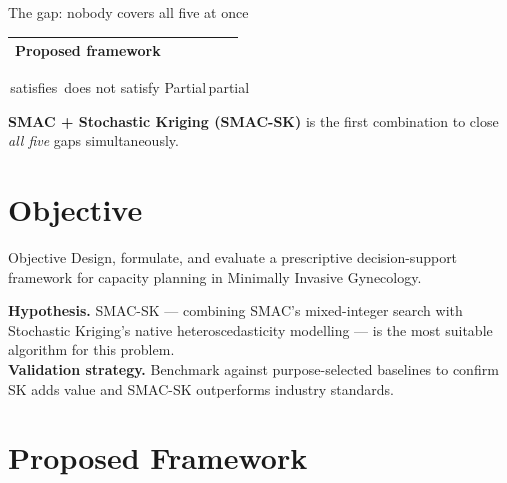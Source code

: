 \documentclass[xcolor=svgnames]{beamer}
\newcommand{\cmark}{\ding{51}}
\newcommand{\xmark}{\ding{55}}
\begin{document}
\begin{frame}{The gap: nobody covers all five at once}
\begin{center}
{\begin{tabular}{lccccc}
				\midrule
				\rowcolor{ucnavy!12}
				\textbf{Proposed framework}
				& \textcolor{okgreen}{\cmark} & \textcolor{okgreen}{\cmark} & \textcolor{okgreen}{\cmark} & \textcolor{okgreen}{\cmark} & \textcolor{okgreen}{\cmark} \\
				\bottomrule
			\end{tabular}%
		}
	\end{center}
	\vfill
	{\tiny
		\textcolor{okgreen}{\cmark}\,satisfies \quad
		\textcolor{nogray}{\xmark}\,does not satisfy \quad
		\textcolor{ucblue}{Partial}\,partial \\[2pt]
	}
	\vspace{0.3em}
	\begin{tcolorbox}[colback=okgreen!9,colframe=okgreen,arc=2mm,boxrule=0.8pt,
	                  left=3mm,right=3mm,top=1.5mm,bottom=1.5mm]
		\centering\small
		\textbf{SMAC + Stochastic Kriging (SMAC-SK)} is the first combination to
		close \emph{all five} gaps simultaneously.
	\end{tcolorbox}
\end{frame}


\section{Objective}
\begin{frame}{Objective}
	\justifying
	Design, formulate, and evaluate a prescriptive decision-support framework for
	capacity planning in Minimally Invasive Gynecology.

	\vspace{0.9em}
	\begin{tcolorbox}[colback=ucnavy!9,colframe=ucnavy,arc=2mm,boxrule=0.8pt,
	                  left=3mm,right=3mm,top=2mm,bottom=2mm]
		\textbf{Hypothesis.} SMAC-SK --- combining SMAC's mixed-integer search with
		Stochastic Kriging's native heteroscedasticity modelling --- is the most
		suitable algorithm for this problem.\\[0.3em]
		\textbf{Validation strategy.} Benchmark against purpose-selected baselines
		to confirm SK adds value and SMAC-SK outperforms industry standards.
	\end{tcolorbox}
\end{frame}




\section{Proposed Framework}
\end{document}
